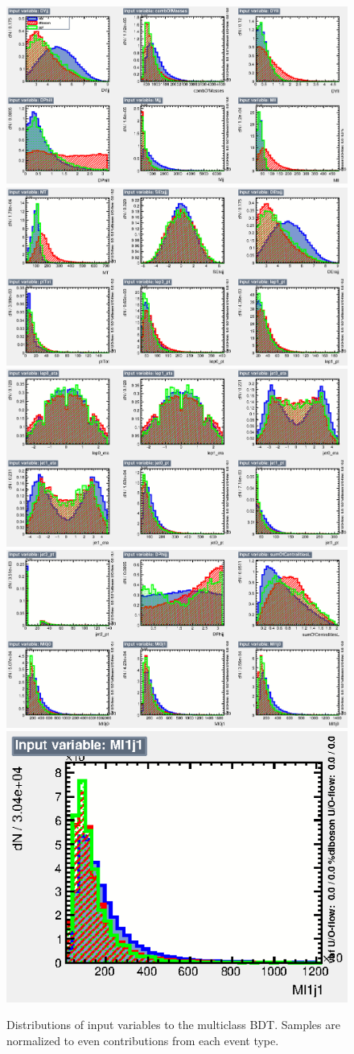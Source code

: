 \begin{figure}[!htbp]
    \centering
    \includegraphics[width=0.45\linewidth]{Pictures/finalBDT_def/variables_id_c1.eps} \quad
    \includegraphics[width=0.45\linewidth]{Pictures/finalBDT_def/variables_id_c2.eps} 
    \medskip
    \includegraphics[width=0.45\linewidth]{Pictures/finalBDT_def/variables_id_c3.eps} \quad
    \includegraphics[width=0.45\linewidth]{Pictures/finalBDT_def/variables_id_c4.eps} 
    \medskip
    \includegraphics[width=0.45\linewidth]{Pictures/finalBDT_def/variables_id_c5.eps}
    \caption{Distributions of input variables to the multiclass BDT. Samples are normalized to even contributions from each event type.}
    \label{fig:multiclassBDTinput}
\end{figure}
